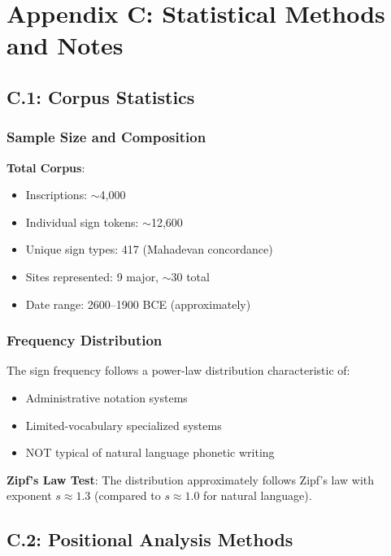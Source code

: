 \chapter*{Appendix C: Statistical Methods and Notes}

\section*{C.1: Corpus Statistics}

\subsection*{Sample Size and Composition}

\textbf{Total Corpus}:
\begin{itemize}
    \item Inscriptions: $\sim$4,000
    \item Individual sign tokens: $\sim$12,600
    \item Unique sign types: 417 (Mahadevan concordance)
    \item Sites represented: 9 major, $\sim$30 total
    \item Date range: 2600--1900 BCE (approximately)
\end{itemize}

\subsection*{Frequency Distribution}

The sign frequency follows a power-law distribution characteristic of:
\begin{itemize}
    \item Administrative notation systems
    \item Limited-vocabulary specialized systems
    \item NOT typical of natural language phonetic writing
\end{itemize}

\textbf{Zipf's Law Test}: The distribution approximately follows Zipf's law with exponent $s \approx 1.3$ (compared to $s \approx 1.0$ for natural language).

\section*{C.2: Positional Analysis Methods}

